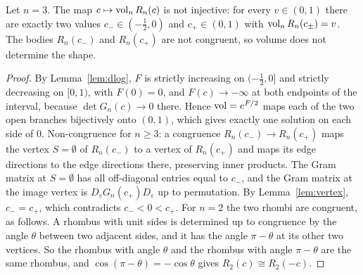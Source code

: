 \begin{theorem}\label{thm:main}
Let $n=3$. The map $c\mapsto\operatorname{vol}_nR_n(c)$ is not injective: for every $v\in(0,1)$ there are exactly two values $c_-\in(- \frac{1}{2},0)$ and $c_+\in(0,1)$ with $\operatorname{vol}_nR_n(c_\pm)=v$.
The bodies $R_n(c_-)$ and $R_n(c_+)$ are not congruent, so volume does not determine the shape.
\end{theorem}
\begin{proof}
By Lemma~\ref{lem:dlog}, $F$ is strictly increasing on $(- \frac{1}{2},0]$ and strictly decreasing on $[0,1)$, with $F(0)=0$, and $F(c)\to-\infty$ at both endpoints of the interval, because $\det G_n(c)\to0$ there.
Hence $\operatorname{vol}=e^{F/2}$ maps each of the two open branches bijectively onto $(0,1)$, which gives exactly one solution on each side of $0$.
Non-congruence for $n\ge3$: a congruence $R_n(c_-)\to R_n(c_+)$ maps the vertex $S=\emptyset$ of $R_n(c_-)$ to a vertex of $R_n(c_+)$ and maps its edge directions to the edge directions there, preserving inner products. The Gram matrix at $S=\emptyset$ has all off-diagonal entries equal to $c_-$, and the Gram matrix at the image vertex is $D_\varepsilon G_n(c_+)D_\varepsilon$ up to permutation. By Lemma~\ref{lem:vertex}, $c_-=c_+$, which contradicts $c_-<0<c_+$. For $n=2$ the two rhombi are congruent, as follows. A rhombus with unit sides is determined up to congruence by the angle $\theta$ between two adjacent sides, and it has the angle $\pi-\theta$ at its other two vertices. So the rhombus with angle $\theta$ and the rhombus with angle $\pi-\theta$ are the same rhombus, and $\cos(\pi-\theta)=-\cos\theta$ gives $R_2(c)\cong R_2(-c)$.
\end{proof}
